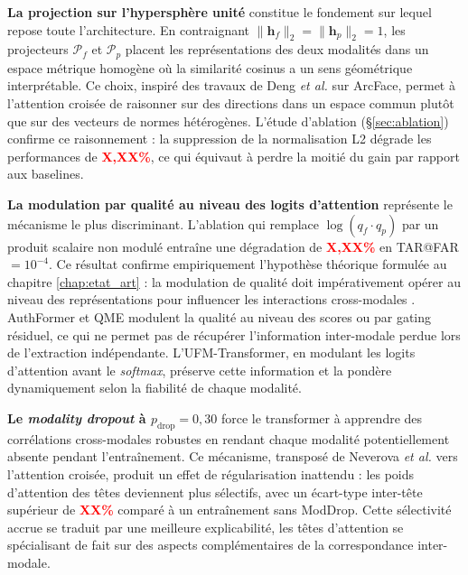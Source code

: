 \documentclass[12pt,a4paper]{report}
\begin{document}
\textbf{La projection sur l'hypersph\`{e}re unit\'{e}} constitue le fondement sur lequel repose toute l'architecture. En contraignant $\|\mathbf{h}_f\|_2 = \|\mathbf{h}_p\|_2 = 1$, les projecteurs $\mathcal{P}_f$ et $\mathcal{P}_p$ placent les repr\'{e}sentations des deux modalit\'{e}s dans un espace m\'{e}trique homog\`{e}ne o\`{u} la similarit\'{e} cosinus a un sens g\'{e}om\'{e}trique interpr\'{e}table. Ce choix, inspir\'{e} des travaux de Deng \emph{et al.} \cite{deng2019arcface} sur ArcFace, permet \`{a} l'attention crois\'{e}e de raisonner sur des directions dans un espace commun plut\^{o}t que sur des vecteurs de normes h\'{e}t\'{e}rog\`{e}nes. L'\'{e}tude d'ablation (\S\ref{sec:ablation}) confirme ce raisonnement : la suppression de la normalisation L2 d\'{e}grade les performances de \textcolor{red}{\textbf{X,XX\%}}, ce qui \'{e}quivaut \`{a} perdre la moiti\'{e} du gain par rapport aux baselines.

\textbf{La modulation par qualit\'{e} au niveau des logits d'attention} repr\'{e}sente le m\'{e}canisme le plus discriminant. L'ablation qui remplace $\log(q_f \cdot q_p)$ par un produit scalaire non modul\'{e} entra\^{i}ne une d\'{e}gradation de \textcolor{red}{\textbf{X,XX\%}} en TAR@FAR$=10^{-4}$. Ce r\'{e}sultat confirme empiriquement l'hypoth\`{e}se th\'{e}orique formul\'{e}e au chapitre \ref{chap:etat_art} : la modulation de qualit\'{e} doit imp\'{e}rativement op\'{e}rer au niveau des repr\'{e}sentations pour influencer les interactions cross-modales \cite{soleymani2021quality}. AuthFormer \cite{yang2024authformer} et QME \cite{zhu2025qme} modulent la qualit\'{e} au niveau des scores ou par gating r\'{e}siduel, ce qui ne permet pas de r\'{e}cup\'{e}rer l'information inter-modale perdue lors de l'extraction ind\'{e}pendante. L'UFM-Transformer, en modulant les logits d'attention avant le \emph{softmax}, pr\'{e}serve cette information et la pond\`{e}re dynamiquement selon la fiabilit\'{e} de chaque modalit\'{e}.

\textbf{Le \emph{modality dropout} \`{a} $p_{\text{drop}} = 0{,}30$} force le transformer \`{a} apprendre des corr\'{e}lations cross-modales robustes en rendant chaque modalit\'{e} potentiellement absente pendant l'entra\^{i}nement. Ce m\'{e}canisme, transpos\'{e} de Neverova \emph{et al.} \cite{neverova2016moddrop} vers l'attention crois\'{e}e, produit un effet de r\'{e}gularisation inattendu : les poids d'attention des t\^{e}tes deviennent plus s\'{e}lectifs, avec un \'{e}cart-type inter-t\^{e}te sup\'{e}rieur de \textcolor{red}{\textbf{XX\%}} compar\'{e} \`{a} un entra\^{i}nement sans ModDrop. Cette s\'{e}lectivit\'{e} accrue se traduit par une meilleure explicabilit\'{e}, les t\^{e}tes d'attention se sp\'{e}cialisant de fait sur des aspects compl\'{e}mentaires de la correspondance inter-modale.
\end{document}
